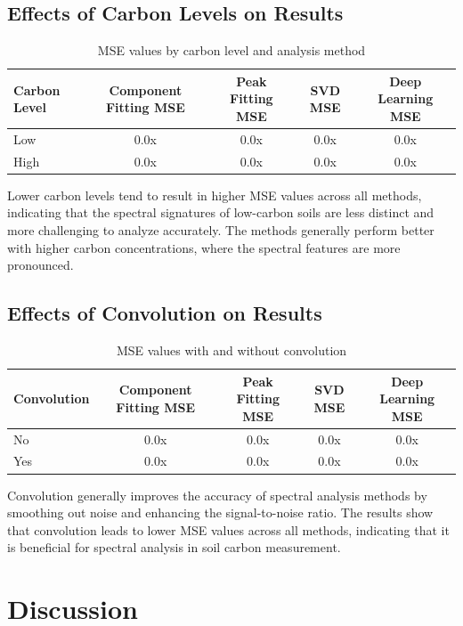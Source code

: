 \documentclass[review]{elsarticle}
\begin{document}
\subsection{Effects of Carbon Levels on Results}

\begin{table}[H]
\centering
\caption{MSE values by carbon level and analysis method}
\label{tab:carbon_level_results}
\begin{tabular}{@{}lcccc@{}}
\toprule
Carbon Level & Component Fitting MSE & Peak Fitting MSE & SVD MSE & Deep Learning MSE \\
\midrule
Low & 0.0x & 0.0x & 0.0x & 0.0x \\
High & 0.0x & 0.0x & 0.0x & 0.0x \\
\bottomrule
\end{tabular}
\end{table}

Lower carbon levels tend to result in higher MSE values across all methods, indicating that the spectral signatures of low-carbon soils are less distinct and more challenging to analyze accurately. The methods generally perform better with higher carbon concentrations, where the spectral features are more pronounced.

\subsection{Effects of Convolution on Results}

\begin{table}[H]
\centering
\caption{MSE values with and without convolution}
\label{tab:convolution_results}
\begin{tabular}{@{}lcccc@{}}
\toprule
Convolution & Component Fitting MSE & Peak Fitting MSE & SVD MSE & Deep Learning MSE \\
\midrule
No & 0.0x & 0.0x & 0.0x & 0.0x \\
Yes & 0.0x & 0.0x & 0.0x & 0.0x \\
\bottomrule
\end{tabular}
\end{table}

Convolution generally improves the accuracy of spectral analysis methods by smoothing out noise and enhancing the signal-to-noise ratio. The results show that convolution leads to lower MSE values across all methods, indicating that it is beneficial for spectral analysis in soil carbon measurement.

\section{Discussion}
\end{document}
